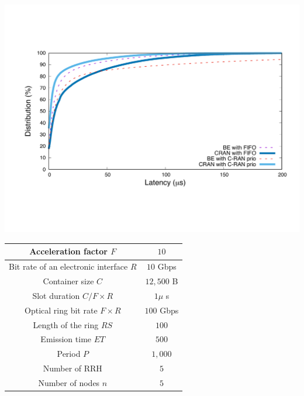 \documentclass[]{algotel}
\begin{document}
    \begin{minipage}[b]{0.50\linewidth}


        \begin{center}
      \includegraphics[scale=0.3]{opport.pdf}

          \label{fig:resultopport}
      \end{center} 
  \end{minipage}
\hfill
  \begin{minipage}[b]{0.40\linewidth}
  \vspace{-2cm}
  \scalebox{0.7}
  {
  \centering
  \begin{tabular}{|c|c|}
  \hline
 Acceleration factor $F$ & $10$  \tabularnewline
  \hline
  Bit rate of an electronic interface $R$ & $10$ Gbps \tabularnewline
  \hline
  Container size  $C$ & $12,500$ B  \tabularnewline
  \hline
  Slot duration $C/F\times R$ & $1\mu$ s \tabularnewline
  \hline
  Optical ring bit rate $F\times R$ & $100$ Gbps \tabularnewline
  \hline
  Length of the ring $RS$ & $100$ \tabularnewline
  \hline
  Emission time $ET$ & $500$ \tabularnewline
  \hline
   Period $P$ & $1,000$ \tabularnewline
  \hline
  Number of RRH & $5$  \tabularnewline
  \hline
  Number of nodes $n$ & $5$  \tabularnewline
  \hline
  \end{tabular}
  }
  \vspace{0.75cm}
  \label{fig:params}

  \end{minipage} 
  
\end{document}
